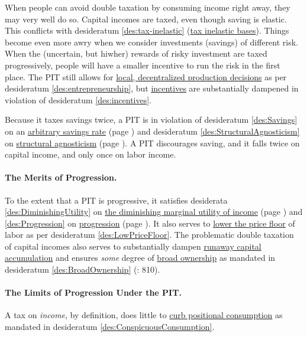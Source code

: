 When people can avoid double taxation by consuming income right away, they may very well do so. Capital incomes are taxed, even though saving is elastic. This conflicts with desideratum \ref{des:tax-inelastic} (\hyperref[des:tax-inelastic]{tax inelastic bases}). Things become even more awry when we consider investments (savings) of different risk. When the (uncertain, but hiwher) rewards of risky investment are taxed progressively, people will have a smaller incentive to run the risk in the first place. The PIT still allows for \hyperref[des:entrepreneurship]{local, decentralized production decisions} as per desideratum \ref{des:entrepreneurship}, but \hyperref[des:incentives]{incentives} are substantially dampened in violation of desideratum \ref{des:incentives}. 

Because it taxes savings twice, a PIT is in violation of desideratum \ref{des:Savings} on an \hyperref[des:Savings]{arbitrary savings rate} (page \pageref{des:Savings}) and desideratum \ref{des:StructuralAgnosticism} on \hyperref[des:StructuralAgnosticism]{structural agnosticism} (page \pageref{des:StructuralAgnosticism}). A PIT discourages saving, and it falls twice on capital income, and only once on labor income.

\paragraph{The Merits of Progression.} To the extent that a PIT is progressive, it satisfies desiderata \ref{des:DiminishingUtility} on \hyperref[des:DiminishingUtility]{the diminishing marginal utility of income} (page \pageref{des:DiminishingUtility}) and \ref{des:Progression} on \hyperref[des:Progression]{progression} (page \pageref{des:Progression}). It also serves to \hyperref[des:LowPriceFloor]{lower the price floor} of labor as per desideratum \ref{des:LowPriceFloor}. The problematic double taxation of capital incomes also serves to substantially dampen \hyperref[sec:GovDynofIneq]{runaway capital accumulation} and ensures \emph{some} degree of \hyperref[des:BroadOwnership]{broad ownership} as mandated in desideratum \ref{des:BroadOwnership} (\citealt{McCaffery2005}: 810). 

\paragraph{The Limits of Progression Under the PIT.} A tax on \emph{income}, by definition, does little to \hyperref[des:ConspicuousConsumption]{curb positional consumption} as mandated in desideratum \ref{des:ConspicuousConsumption}. 

